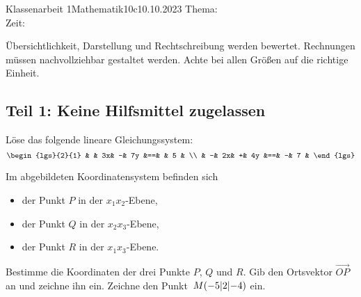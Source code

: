 \documentclass[12pt]{../exam2e}
\begin{document}
\begin{klassenarbeitskopf}{Klassenarbeit 1}{Mathematik}{10c}{10.10.2023}
	Thema:\\
	Zeit:	
\end{klassenarbeitskopf}

\vspace*{1.5ex}
Übersichtlichkeit, Darstellung und Rechtschreibung werden bewertet.
Rechnungen müssen nachvollziehbar gestaltet werden. 
Achte bei allen Größen auf die richtige Einheit.




\begin{questions}%

\subsection*{Teil 1: Keine Hilfsmittel zugelassen}

\begin{question}[4]
	Löse das folgende lineare Gleichungssystem:
\begin{equation*}
\begin{lgs}{2}{1}
	&  & 3x& -& 7y	&==&  & 5	&	\\
	& -& 2x& +& 4y	&==& -& 7	&
\end{lgs}
\end{equation*}
\end{question}
\omitsolution




\clearpage



\begin{question}[6]
Im abgebildeten Koordinatensystem befinden sich
\begin{itemize}
	\item der Punkt $P$ in der $x_1x_2$-Ebene,
	\item der Punkt $Q$ in der $x_2x_3$-Ebene,
	\item der Punkt $R$ in der $x_1x_3$-Ebene.
\end{itemize}
\begin{subparts}
	\subpart Bestimme die Koordinaten der drei Punkte $P$, $Q$ und $R$.
	\subpart Gib den Ortsvektor $\overrightarrow{OP}$ an und zeichne ihn ein.
	\subpart Zeichne den Punkt~$M\coords(-5,2,-4)$ ein. 
\end{subparts}


\end{question}
\end{questions}
\end{document}
